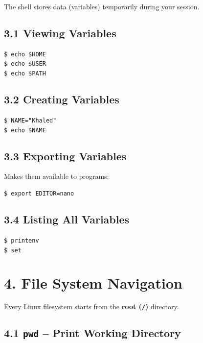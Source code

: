 \documentclass[12pt]{article}
\begin{document}
The shell stores data (variables) temporarily during your session.

\subsection*{3.1 Viewing Variables}

\begin{highlightbox}
\texttt{\$ echo \$HOME}\\
\texttt{\$ echo \$USER}\\
\texttt{\$ echo \$PATH}
\end{highlightbox}

\subsection*{3.2 Creating Variables}

\begin{highlightbox}
\texttt{\$ NAME="Khaled"}\\
\texttt{\$ echo \$NAME}
\end{highlightbox}

\subsection*{3.3 Exporting Variables}

Makes them available to programs:

\begin{highlightbox}
\texttt{\$ export EDITOR=nano}
\end{highlightbox}

\subsection*{3.4 Listing All Variables}

\begin{highlightbox}
\texttt{\$ printenv}\\
\texttt{\$ set}
\end{highlightbox}

\section*{4. File System Navigation}

Every Linux filesystem starts from the \textbf{root (\texttt{/})} directory.

\subsection*{4.1 \texttt{pwd} – Print Working Directory}
\end{document}
